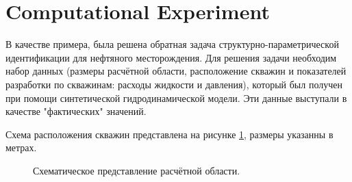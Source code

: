 \documentclass{article}
\begin{document}
\section{Computational Experiment}
В качестве примера, была решена обратная задача структурно-параметрической идентификации для нефтяного месторождения. Для решения задачи необходим набор данных (размеры расчётной области, расположение скважин и показателей разработки по скважинам: расходы жидкости и давления), который был получен при помощи синтетической гидродинамической модели. Эти данные выступали в качестве "фактических" значений. 

Схема расположения скважин представлена на рисунке \ref{fig:map}, размеры указанны в метрах. 
\begin{figure}
    \begin{minipage}[h]{0.69\linewidth}
    \end{minipage} \hfill
    \begin{minipage}[h]{0.29\linewidth}
    \end{minipage} 
    \caption{Схематическое представление расчётной области.}
    \label{fig:map}
\end{figure}
\end{document}
